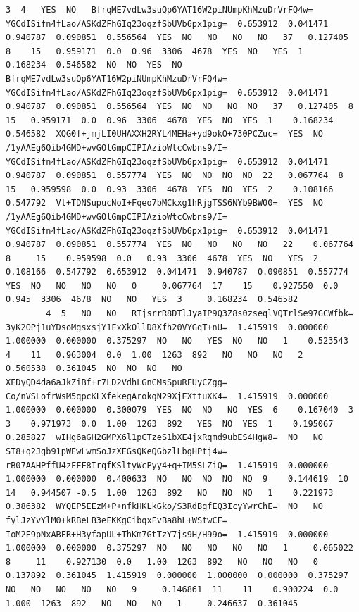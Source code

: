 \documentclass[11pt]{article}
\begin{document}
\begin{Verbatim}[commandchars=\\\{\}]
        3  4   YES  NO   BfrqME7vdLw3suQp6YAT16W2piNUmpKhMzuDrVrFQ4w=  YGCdISifn4fLao/ASKdZFhGIq23oqzfSbUVb6px1pig=  0.653912  0.041471  0.940787  0.090851  0.556564  YES  NO   NO   NO   NO   37   0.127405  8    15   0.959171  0.0  0.96  3306  4678  YES  NO   YES  1    0.168234  0.546582  NO  NO  YES  NO   BfrqME7vdLw3suQp6YAT16W2piNUmpKhMzuDrVrFQ4w=  YGCdISifn4fLao/ASKdZFhGIq23oqzfSbUVb6px1pig=  0.653912  0.041471  0.940787  0.090851  0.556564  YES  NO  NO   NO  NO   37   0.127405  8    15   0.959171  0.0  0.96  3306  4678  YES  NO  YES  1    0.168234  0.546582  XQG0f+jmjLI0UHAXXH2RYL4MEHa+yd9okO+730PCZuc=  YES  NO  /1yAAEg6Qib4GMD+wvGOlGmpCIPIAzioWtcCwbns9/I=  YGCdISifn4fLao/ASKdZFhGIq23oqzfSbUVb6px1pig=  0.653912  0.041471  0.940787  0.090851  0.557774  YES  NO  NO  NO  NO  22   0.067764  8    15   0.959598  0.0  0.93  3306  4678  YES  NO  YES  2    0.108166  0.547792  Vl+TDNSupucNoI+Fqeo7bMCkxg1hRjgTSS6NYb9BW00=  YES  NO  /1yAAEg6Qib4GMD+wvGOlGmpCIPIAzioWtcCwbns9/I=  YGCdISifn4fLao/ASKdZFhGIq23oqzfSbUVb6px1pig=  0.653912  0.041471  0.940787  0.090851  0.557774  YES  NO   NO   NO   NO   22    0.067764  8     15    0.959598  0.0   0.93  3306  4678  YES  NO   YES  2     0.108166  0.547792  0.653912  0.041471  0.940787  0.090851  0.557774  YES  NO   NO   NO   NO   0     0.067764  17    15    0.927550  0.0   0.945  3306  4678  NO   NO   YES  3     0.168234  0.546582
        4  5   NO   NO   RTjsrrR8DTlJyaIP9Q3Z8s0zseqlVQTrlSe97GCWfbk=  3yK2OPj1uYDsoMgsxsjY1FxXkOllD8Xfh20VYGqT+nU=  1.415919  0.000000  1.000000  0.000000  0.375297  NO   NO   YES  NO   NO   1    0.523543  4    11   0.963004  0.0  1.00  1263  892   NO   NO   NO   2    0.560538  0.361045  NO  NO  NO   NO   XEDyQD4da6aJkZiBf+r7LD2VdhLGnCMsSpuRFUyCZgg=  Co/nVSLofrWsM5qpcKLXfekegArokgN29XjEXttuXK4=  1.415919  0.000000  1.000000  0.000000  0.300079  YES  NO  NO   NO  YES  6    0.167040  3    3    0.971973  0.0  1.00  1263  892   YES  NO  YES  1    0.195067  0.285827  wIHg6aGH2GMPX6l1pCTzeS1bXE4jxRqmd9ubES4HgW8=  NO   NO  ST8+q2Jgb91pWEwLwmSoJzXEGsQKeQGbzlLbgHPtj4w=  rB07AAHPffU4zFFF8IrqfKSltyWcPyy4+q+IM5SLZiQ=  1.415919  0.000000  1.000000  0.000000  0.400633  NO   NO  NO  NO  NO  9    0.144619  10   14   0.944507 -0.5  1.00  1263  892   NO   NO  NO   1    0.221973  0.386382  WYQEP5EEzM+P+nfkHKLkGko/S3RdBgfEQ3IcyYwrChE=  NO   NO  fylJzYvYlM0+kRBeLB3eFKKgCibqxFvBa8hL+WStwCE=  IoM2E9pNxABFR+H3yfapUL+ThKm7GtTzY7js9H/H99o=  1.415919  0.000000  1.000000  0.000000  0.375297  NO   NO   NO   NO   NO   1     0.065022  8     11    0.927130  0.0   1.00  1263  892   NO   NO   NO   0     0.137892  0.361045  1.415919  0.000000  1.000000  0.000000  0.375297  NO   NO   NO   NO   NO   9     0.146861  11    11    0.900224  0.0   1.000  1263  892   NO   NO   NO   1     0.246637  0.361045
\end{Verbatim}
            
\end{document}
